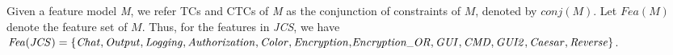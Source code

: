 Given a feature model \emph{M}, we refer TCs and CTCs of \emph{M} as  the conjunction of constraints of $M$, denoted by $\mathit{conj(M)}$. Let $\mathit{Fea(M)}$ denote the feature set of $M$. Thus, for the features in \emph{JCS}, we have $\mathit{Fea(JCS)} = \{\scriptsize{\mathit{Chat}, \mathit{Output}, \mathit{Logging}, \mathit{Authorization}, \mathit{Color}, \mathit{Encryption},} \\
\mathit{Encryption\_OR}, \mathit{GUI}, \mathit{CMD}, \mathit{GUI2}, \mathit{Caesar}, \mathit{Reverse}\}$.%





